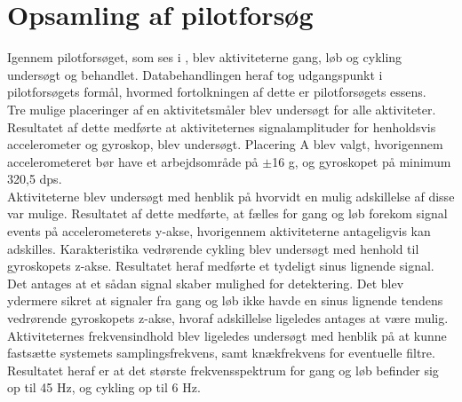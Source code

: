 \section{Opsamling af pilotforsøg}
Igennem pilotforsøget, som ses i , blev aktiviteterne gang, løb og cykling undersøgt og behandlet. Databehandlingen heraf tog udgangspunkt i pilotforsøgets formål, hvormed fortolkningen af dette er pilotforsøgets essens. \\
Tre mulige placeringer af en aktivitetsmåler blev undersøgt for alle aktiviteter. Resultatet af dette medførte at aktiviteternes signalamplituder for henholdsvis accelerometer og gyroskop, blev undersøgt. Placering A blev valgt, hvorigennem accelerometeret bør have et arbejdsområde på $\pm$16 g, og gyroskopet på minimum 320,5 dps. \\
Aktiviteterne blev undersøgt med henblik på hvorvidt en mulig adskillelse af disse var mulige. Resultatet af dette medførte, at fælles for gang og løb forekom signal events på accelerometerets y-akse, hvorigennem aktiviteterne antageligvis kan adskilles. Karakteristika vedrørende cykling blev undersøgt med henhold til gyroskopets z-akse. Resultatet heraf medførte et tydeligt sinus lignende signal. Det antages at et sådan signal skaber mulighed for detektering. Det blev ydermere sikret at signaler fra gang og løb ikke havde en sinus lignende tendens vedrørende gyroskopets z-akse, hvoraf adskillelse ligeledes antages at være mulig. \\
Aktiviteternes frekvensindhold blev ligeledes undersøgt med henblik på at kunne fastsætte systemets samplingsfrekvens, samt knækfrekvens for eventuelle filtre. Resultatet heraf er at det største frekvensspektrum for gang og løb befinder sig op til 45 Hz, og cykling op til 6 Hz. 

